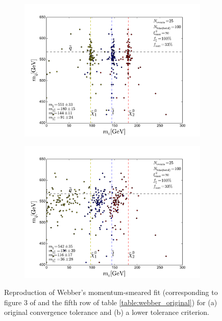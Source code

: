 \documentclass[twoside,english]{uiofysmaster}
\begin{document}
\begin{figure}[hbt]
	\centering
	\begin{subfigure}[b]{0.6\textwidth}
		\includegraphics[width=\textwidth]{figures/webber_rec_table/webber_HW-rec_OFL_minuit-minimizer_hightol_10pmomsmear_nocut.pdf} 
		\caption{ }
	\end{subfigure}

	\begin{subfigure}[b]{0.6\textwidth}
		\includegraphics[width=\textwidth]{figures/webber_rec_table/webber_HW-rec_OFL_minuit-minimizer_lowtol_10pmomsmear_nocut.pdf}
		\caption{ } 
	\end{subfigure}
	\caption{Reproduction of Webber's momentum-smeared fit (corresponding to figure 3 of \cite{Webber:2009vm} and the fifth row of table \ref{table:webber_original}) for (a) original convergence tolerance and (b) a lower tolerance criterion.}
	\label{fig:webber_rec_scatter_tolerance-comparison_10pmomsmear}
\end{figure}
\end{document}
